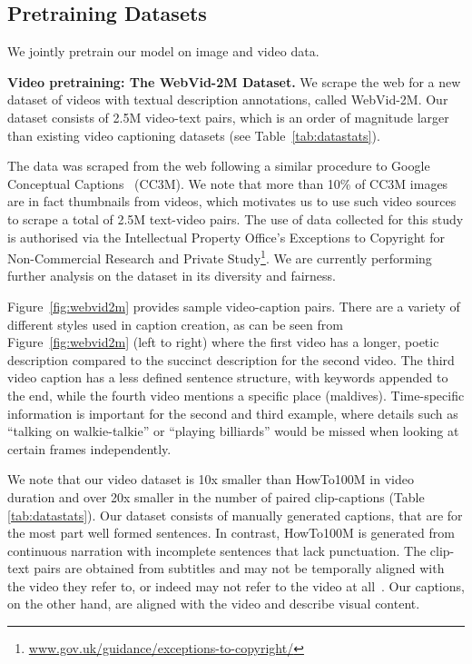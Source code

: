 \documentclass[10pt,twocolumn,letterpaper]{article}
\begin{document}
\subsection{Pretraining Datasets}
\label{subsec:datasets1}
We jointly pretrain our model on image and video data.

\noindent\textbf{Video pretraining: The WebVid-2M Dataset.}
We scrape the web for a new dataset of videos with textual description annotations, called WebVid-2M. Our dataset consists of 2.5M video-text pairs, which is an order of magnitude larger than existing video captioning datasets (see Table~\ref{tab:datastats}).

The data was scraped from the web following a similar procedure to Google Conceptual Captions~\cite{sharma2018conceptual} (CC3M). We note that more than 10\% of CC3M images are in fact thumbnails from videos, which motivates us to use such video sources to scrape a total of 2.5M text-video pairs.
The use of data collected for this study is authorised via the Intellectual Property Office’s Exceptions to Copyright for Non-Commercial Research and Private Study\footnote{\url{www.gov.uk/guidance/exceptions-to-copyright/}}. We are currently performing further analysis on the dataset in its diversity and fairness.

Figure~\ref{fig:webvid2m} provides sample video-caption pairs. There are a variety of different styles used in caption 
creation, as can be seen from Figure~\ref{fig:webvid2m} (left to right) where the first video has a longer, poetic 
description compared to the succinct description for the second video. The third video caption has a less defined sentence 
structure, with keywords appended to the end, while the fourth video mentions a specific place (maldives). Time-specific information is important for the second and third example, where details such as ``talking on walkie-talkie'' or ``playing billiards'' would be missed when looking at certain frames independently.

We note that our video dataset is 10x smaller than HowTo100M in video duration and over 20x smaller in the number of paired clip-captions (Table \ref{tab:datastats}). Our dataset consists of manually generated captions, that are for the most part well formed sentences. In contrast, HowTo100M is generated from continuous narration with incomplete sentences that lack punctuation. The clip-text pairs are obtained from subtitles and may not be temporally aligned with the video they refer to, or indeed may not refer to the video at all~\cite{miech2019howto100m}. Our captions, on the other hand, are aligned with the video and describe visual content.
\end{document}
